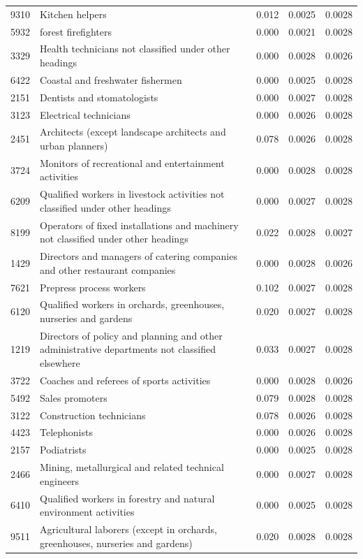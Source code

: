 \begin{longtable}{p{}>{\raggedright\arraybackslash}p{}rrr}
9310 & Kitchen helpers & 0.012 & 0.0025 & 0.0028 \\
5932 & forest firefighters & 0.000 & 0.0021 & 0.0028 \\
3329 & Health technicians not classified under other headings & 0.000 & 0.0028 & 0.0026 \\
6422 & Coastal and freshwater fishermen & 0.000 & 0.0025 & 0.0028 \\
2151 & Dentists and stomatologists & 0.000 & 0.0027 & 0.0028 \\
3123 & Electrical technicians & 0.000 & 0.0026 & 0.0028 \\
2451 & Architects (except landscape architects and urban planners) & 0.078 & 0.0026 & 0.0028 \\
3724 & Monitors of recreational and entertainment activities & 0.000 & 0.0028 & 0.0028 \\
6209 & Qualified workers in livestock activities not classified under other headings & 0.000 & 0.0027 & 0.0028 \\
8199 & Operators of fixed installations and machinery not classified under other headings & 0.022 & 0.0028 & 0.0027 \\
1429 & Directors and managers of catering companies and other restaurant companies & 0.000 & 0.0028 & 0.0026 \\
7621 & Prepress process workers & 0.102 & 0.0027 & 0.0028 \\
6120 & Qualified workers in orchards, greenhouses, nurseries and gardens & 0.020 & 0.0027 & 0.0028 \\
1219 & Directors of policy and planning and other administrative departments not classified elsewhere & 0.033 & 0.0027 & 0.0028 \\
3722 & Coaches and referees of sports activities & 0.000 & 0.0028 & 0.0026 \\
5492 & Sales promoters & 0.079 & 0.0028 & 0.0028 \\
3122 & Construction technicians & 0.078 & 0.0026 & 0.0028 \\
4423 & Telephonists & 0.000 & 0.0026 & 0.0028 \\
2157 & Podiatrists & 0.000 & 0.0025 & 0.0028 \\
2466 & Mining, metallurgical and related technical engineers & 0.000 & 0.0027 & 0.0028 \\
6410 & Qualified workers in forestry and natural environment activities & 0.000 & 0.0025 & 0.0028 \\
9511 & Agricultural laborers (except in orchards, greenhouses, nurseries and gardens) & 0.020 & 0.0028 & 0.0028 \\

\end{longtable}
